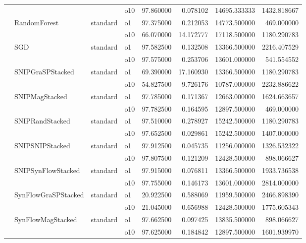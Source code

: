 \begin{longtable}{llllrrrr}
      &     &         & o10 &  97.860000 &   0.078102 &     14695.333333 &   1432.818667 \\
      & RandomForest & standard & o1 &  97.375000 &   0.212053 &     14773.500000 &    469.000000 \\
      &     &         & o10 &  66.070000 &  14.172777 &     17118.500000 &   1180.290783 \\
      & SGD & standard & o1 &  97.582500 &   0.132508 &     13366.500000 &   2216.407529 \\
      &     &         & o10 &  97.575000 &   0.253706 &     13601.000000 &    541.554552 \\
      & SNIPGraSPStacked & standard & o1 &  69.390000 &  17.160930 &     13366.500000 &   1180.290783 \\
      &     &         & o10 &  54.827500 &   9.726176 &     10787.000000 &   2232.886622 \\
      & SNIPMagStacked & standard & o1 &  97.785000 &   0.171367 &     12663.000000 &   1624.663657 \\
      &     &         & o10 &  97.782500 &   0.164595 &     12897.500000 &    469.000000 \\
      & SNIPRandStacked & standard & o1 &  97.510000 &   0.278927 &     15242.500000 &   1180.290783 \\
      &     &         & o10 &  97.652500 &   0.029861 &     15242.500000 &   1407.000000 \\
      & SNIPSNIPStacked & standard & o1 &  97.912500 &   0.045735 &     11256.000000 &   1326.532322 \\
      &     &         & o10 &  97.807500 &   0.121209 &     12428.500000 &    898.066627 \\
      & SNIPSynFlowStacked & standard & o1 &  97.915000 &   0.076811 &     13366.500000 &   1933.736538 \\
      &     &         & o10 &  97.755000 &   0.146173 &     13601.000000 &   2814.000000 \\
      & SynFlowGraSPStacked & standard & o1 &  20.922500 &   0.588069 &     11959.500000 &   2466.898390 \\
      &     &         & o10 &  21.045000 &   0.656988 &     12428.500000 &   1775.605343 \\
      & SynFlowMagStacked & standard & o1 &  97.662500 &   0.097425 &     13835.500000 &    898.066627 \\
      &     &         & o10 &  97.625000 &   0.184842 &     12897.500000 &   1601.939970 \\

\end{longtable}
